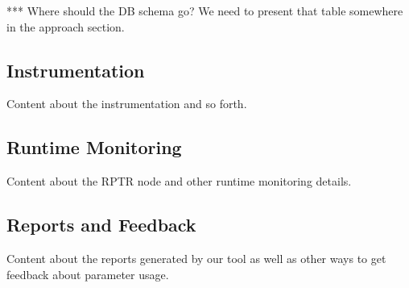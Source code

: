 *** Where should the DB schema go? We need to present that table somewhere in the approach section.


\subsection{Instrumentation}

Content about the instrumentation and so forth.


\subsection{Runtime Monitoring}

Content about the RPTR node and other runtime monitoring details.


\subsection{Reports and Feedback}

Content about the reports generated by our tool as well as other ways to get feedback about parameter usage.
